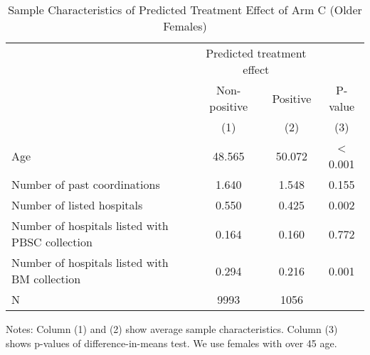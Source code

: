 \documentclass[
]{article}
\begin{document}
\begin{table}[H]

\caption{\label{tab:rcf-older-female}Sample Characteristics of Predicted Treatment Effect of Arm C (Older Females)}
\centering
\fontsize{9}{11}\selectfont
\fontsize{9}{11}\selectfont
\begin{threeparttable}
\begin{tabular}[t]{lccc}
\toprule
\multicolumn{1}{c}{ } & \multicolumn{2}{c}{Predicted treatment effect} & \multicolumn{1}{c}{ } \\
\cmidrule(l{3pt}r{3pt}){2-3}
\multicolumn{1}{c}{ } & \multicolumn{1}{c}{Non-positive} & \multicolumn{1}{c}{Positive} & \multicolumn{1}{c}{P-value} \\
\cmidrule(l{3pt}r{3pt}){2-2} \cmidrule(l{3pt}r{3pt}){3-3} \cmidrule(l{3pt}r{3pt}){4-4}
 & (1) & (2) & (3)\\
\midrule
Age & 48.565 & 50.072 & < 0.001\\
Number of past coordinations & 1.640 & 1.548 & 0.155\\
Number of listed hospitals & 0.550 & 0.425 & 0.002\\
Number of hospitals listed with PBSC collection & 0.164 & 0.160 & 0.772\\
Number of hospitals listed with BM collection & 0.294 & 0.216 & 0.001\\
N & 9993 & 1056 & \\
\bottomrule
\end{tabular}
\begin{tablenotes}
\item Notes: Column (1) and (2) show average sample characteristics. Column (3) shows p-values of difference-in-means test. We use females with over 45 age.
\end{tablenotes}
\end{threeparttable}
\end{table}

\clearpage

\renewcommand\refname{References}
  
\end{document}
